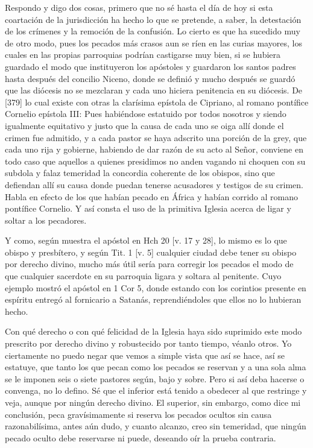 Respondo y digo dos cosas, primero que no sé hasta el día de hoy si esta coartación de la jurisdicción ha hecho lo que se pretende, a saber, la detestación de los crímenes y la remoción de la confusión. Lo cierto es que ha sucedido muy de otro modo, pues los pecados más crasos aun se ríen en las curias mayores, los cuales en las propias parroquias podrían castigarse muy bien, si se hubiera guardado el modo que instituyeron los apóstoles y guardaron los santos padres hasta después del concilio Niceno, donde se definió y mucho después se guardó que las diócesis no se mezclaran y cada uno hiciera penitencia en su diócesis. De [379] lo cual existe con otras la clarísima epístola de Cipriano, al romano pontífice Cornelio epístola III: Pues habiéndose estatuido por todos nosotros y siendo igualmente equitativo y justo que la causa de cada uno se oiga allí donde el crimen fue admitido, y a cada pastor se haya adscrito una porción de la grey, que cada uno rija y gobierne, habiendo de dar razón de su acto al Señor, conviene en todo caso que aquellos a quienes presidimos no anden vagando ni choquen con su subdola y falaz temeridad la concordia coherente de los obispos, sino que defiendan allí su causa donde puedan tenerse acusadores y testigos de su crimen. Habla en efecto de los que habían pecado en África y habían corrido al romano pontífice Cornelio. Y así consta el uso de la primitiva Iglesia acerca de ligar y soltar a los pecadores.

Y como, según muestra el apóstol en Hch 20 [v. 17 y 28], lo mismo es lo que obispo y presbítero, y según Tit. 1 [v. 5] cualquier ciudad debe tener su obispo por derecho divino, mucho más útil sería para corregir los pecados el modo de que cualquier sacerdote en su parroquia ligara y soltara al penitente. Cuyo ejemplo mostró el apóstol en 1 Cor 5, donde estando con los corintios presente en espíritu entregó al fornicario a Satanás, reprendiéndoles que ellos no lo hubieran hecho.

Con qué derecho o con qué felicidad de la Iglesia haya sido suprimido este modo prescrito por derecho divino y robustecido por tanto tiempo, véanlo otros. Yo ciertamente no puedo negar que vemos a simple vista que así se hace, así se estatuye, que tanto los que pecan como los pecados se reservan y a una sola alma se le imponen seis o siete pastores según, bajo y sobre. Pero si así deba hacerse o convenga, no lo defino. Sé que el inferior está tenido a obedecer al que restringe y veja, aunque por ningún derecho divino. El superior, sin embargo, como dice mi conclusión, peca gravísimamente si reserva los pecados ocultos sin causa razonabilísima, antes aún dudo, y cuanto alcanzo, creo sin temeridad, que ningún pecado oculto debe reservarse ni puede, deseando oír la prueba contraria.

